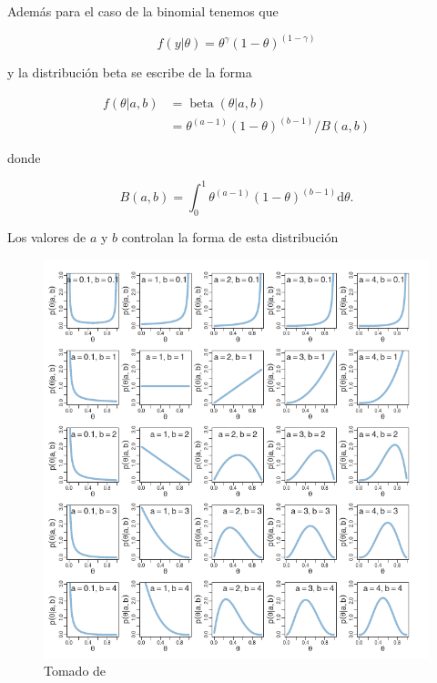 \documentclass[
  12pt,
]{book}
\theoremstyle{definition}
\theoremstyle{definition}
\theoremstyle{definition}
\theoremstyle{remark}
\begin{document}
Además para el caso de la binomial tenemos que

\begin{equation*}
    f(y | \theta)=\theta^{\gamma}(1-\theta)^{(1-\gamma)}
\end{equation*}

y la distribución beta se escribe de la forma

\begin{align*}
    f(\theta | a, b) & =\operatorname{beta}(\theta | a, b)         \\
                     & =\theta^{(a-1)}(1-\theta)^{(b-1)} / B(a, b)
\end{align*}

donde

\begin{equation*}
    B(a, b)=\int_{0}^{1}  \theta^{(a-1)}(1-\theta)^{(b-1)}\mathrm{d} \theta.
\end{equation*}

Los valores de \(a\) y \(b\) controlan la forma de esta distribución

\begin{figure}
\centering
\includegraphics{manual_figures/betas.png}
\caption{Tomado de \textcite{Kruschke2014}}
\end{figure}
\end{document}
